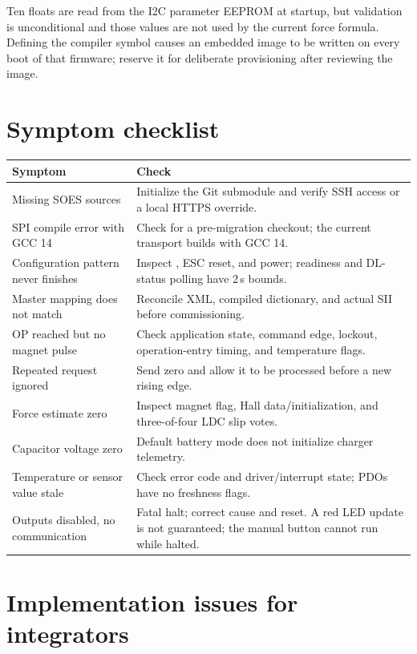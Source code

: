 \documentclass[10pt,a4paper,oneside]{report}
\newcommand{\code}[1]{\texttt{\detokenize{#1}}}
\begin{document}
Ten floats are read from the I2C parameter EEPROM at startup, but
validation is unconditional and those values are not used by the
current force formula. Defining the compiler symbol \code{EEPROM_WRITE}
causes an embedded image to be written on every boot of that firmware;
reserve it for deliberate provisioning after reviewing the image.

\section{Symptom checklist}

\begin{longtable}{L{51mm}L{93mm}}
\toprule
Symptom & Check \\
\midrule
\endhead
Missing SOES sources & Initialize the Git submodule and verify SSH access or a local HTTPS override. \\
SPI compile error with GCC 14 & Check for a pre-migration checkout; the current transport builds with GCC 14. \\
Configuration pattern never finishes & Inspect \code{EEPROM_LOADED}, ESC reset, and power; readiness and DL-status polling have 2\,s bounds. \\
Master mapping does not match & Reconcile XML, compiled dictionary, and actual SII before commissioning. \\
OP reached but no magnet pulse & Check application state, command edge, lockout, operation-entry timing, and temperature flags. \\
Repeated request ignored & Send zero and allow it to be processed before a new rising edge. \\
Force estimate zero & Inspect magnet flag, Hall data/initialization, and three-of-four LDC slip votes. \\
Capacitor voltage zero & Default battery mode does not initialize charger telemetry. \\
Temperature or sensor value stale & Check error code and driver/interrupt state; PDOs have no freshness flags. \\
Outputs disabled, no communication & Fatal halt; correct cause and reset. A red LED update is not guaranteed; the manual button cannot run while halted. \\
\bottomrule
\end{longtable}

\section{Implementation issues for integrators}
\end{document}
